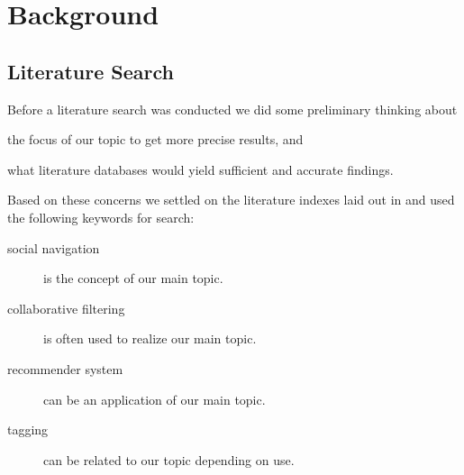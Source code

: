 \chapter{Background}
\label{chapter:background}

%
%
%
%
%
%
%

\section{Literature Search}

Before a literature search was conducted we did some preliminary thinking
about
\begin{inparaenum}[(i)]
  \item the focus of our topic to get more precise results, and
  \item what literature databases would yield sufficient and accurate
    findings.
\end{inparaenum}
Based on these concerns we settled on the literature indexes laid out in
 and used the following keywords%
for search:

\begin{description}
  \item[social navigation] is the concept of our main topic.
  \item[collaborative filtering] is often used to realize our main topic.
  \item[recommender system] can be an application of our main topic.
  \item[tagging] can be related to our topic depending on use.
\end{description}

